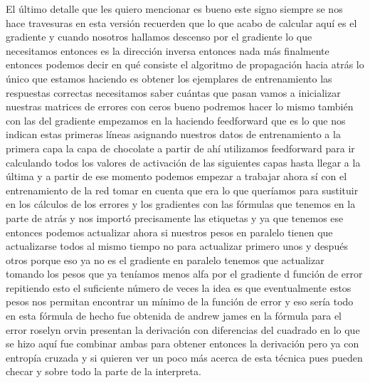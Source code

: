 El último detalle que les quiero mencionar es bueno este signo siempre se nos hace travesuras en esta versión recuerden que lo que acabo de calcular aquí es el gradiente y cuando nosotros hallamos descenso por el gradiente lo que necesitamos entonces es la dirección inversa entonces nada más finalmente entonces podemos decir en qué consiste el algoritmo de propagación hacia atrás lo único que estamos haciendo es obtener los ejemplares de entrenamiento las respuestas correctas necesitamos saber cuántas que pasan vamos a inicializar nuestras matrices de errores con ceros bueno podremos hacer lo mismo también con las del gradiente empezamos en la haciendo feedforward que es lo que nos indican estas primeras líneas asignando nuestros datos de entrenamiento a la primera capa la capa de chocolate a partir de ahí utilizamos feedforward para ir calculando todos los valores de activación de las siguientes capas hasta llegar a la última y a partir de ese momento podemos empezar a trabajar ahora sí con el entrenamiento de la red tomar en cuenta que era lo que queríamos para sustituir en los cálculos de los errores y los gradientes con las fórmulas que tenemos en la parte de atrás y nos importó precisamente las etiquetas y ya que tenemos ese entonces podemos actualizar ahora si nuestros pesos en paralelo tienen que actualizarse todos al mismo tiempo no para actualizar primero unos y después otros porque eso ya no es el gradiente en paralelo tenemos que actualizar tomando los pesos que ya teníamos menos alfa por el gradiente d función de error repitiendo esto el suficiente número de veces la idea es que eventualmente estos pesos nos permitan encontrar un mínimo de la función de error y eso sería todo en esta fórmula de hecho fue obtenida de andrew james en la fórmula para el error roselyn orvin presentan la derivación con diferencias del cuadrado en lo que se hizo aquí fue combinar ambas para obtener entonces la derivación pero ya con entropía cruzada y si quieren ver un poco más acerca de esta técnica pues pueden checar y sobre todo la parte de la interpreta.
